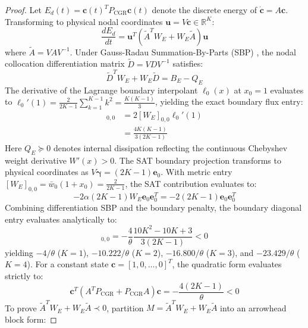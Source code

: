 \documentclass[10pt,twocolumn,a4paper]{article}
\theoremstyle{plain}
\theoremstyle{definition}
\begin{document}
\begin{proof}
Let $E_d(t) = \mathbf{c}(t)^T P_{\mathrm{CGR}} \mathbf{c}(t)$ denote the discrete energy of $\dot{\mathbf{c}} = A \mathbf{c}$. Transforming to physical nodal coordinates $\mathbf{u} = V \mathbf{c} \in \mathbb{R}^K$:
\begin{equation*}
\frac{dE_d}{dt} = \mathbf{u}^T \left( \tilde{A}^T W_E + W_E \tilde{A} \right) \mathbf{u}
\end{equation*}
where $\tilde{A} = V A V^{-1}$. Under Gauss-Radau Summation-By-Parts (SBP) \cite{carpenter1994time, hesthaven2007spectral}, the nodal collocation differentiation matrix $\tilde{D} = V D V^{-1}$ satisfies:
\begin{equation}
\tilde{D}^T W_E + W_E \tilde{D} = B_E - Q_E
\end{equation}
The derivative of the Lagrange boundary interpolant $\ell_0(x)$ at $x_0 = 1$ evaluates to $\ell_0'(1) = \frac{2}{2K-1}\sum_{k=1}^{K-1} k^2 = \frac{K(K-1)}{3}$, yielding the exact boundary flux entry:
\begin{align}
[\tilde{D}^T W_E + W_E \tilde{D}]_{0,0} &= 2 [W_E]_{0,0} \ell_0'(1) \nonumber \\
&= \frac{4K(K-1)}{3(2K-1)}
\end{align}
Here $Q_E \succeq 0$ denotes internal dissipation reflecting the continuous Chebyshev weight derivative $W'(x) > 0$. The SAT boundary projection transforms to physical coordinates as $V \boldsymbol{\gamma} = (2K - 1) \mathbf{e}_0$. With metric entry $[W_E]_{0,0} = \bar{w}_0 (1 + x_0) = \frac{2}{2K-1}$, the SAT contribution evaluates to:
\begin{equation*}
-2 \alpha (2K - 1) W_E \mathbf{e}_0 \mathbf{e}_0^T = -2(2K - 1) \mathbf{e}_0 \mathbf{e}_0^T
\end{equation*}
Combining differentiation SBP and the boundary penalty, the boundary diagonal entry evaluates analytically to:
\begin{equation}
[\tilde{A}^T W_E + W_E \tilde{A}]_{0,0} = -\frac{4}{\theta}\frac{10K^2 - 10K + 3}{3(2K-1)} < 0
\end{equation}
yielding $-4/\theta$ ($K=1$), $-10.222/\theta$ ($K=2$), $-16.800/\theta$ ($K=3$), and $-23.429/\theta$ ($K=4$). For a constant state $\mathbf{c} = [1, 0, \dots, 0]^T$, the quadratic form evaluates strictly to:
\begin{equation*}
\mathbf{c}^T \left( A^T P_{\mathrm{CGR}} + P_{\mathrm{CGR}} A \right) \mathbf{c} = -\frac{4(2K-1)}{\theta} < 0
\end{equation*}
To prove $\tilde{A}^T W_E + W_E \tilde{A} \prec 0$, partition $M = \tilde{A}^T W_E + W_E \tilde{A}$ into an arrowhead block form:

\end{proof}
\end{document}
